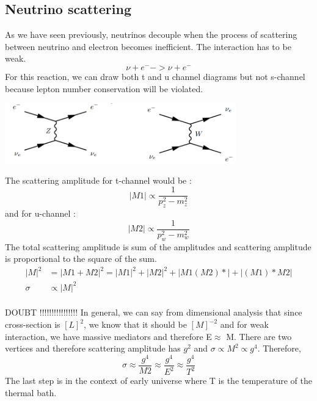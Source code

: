 \documentclass[12pt,a4paper,oneside]{book}
\begin{document}
\subsection{Neutrino scattering}
As we have seen previously, neutrinos decouple when the process of scattering between neutrino and electron becomes inefficient. The interaction has to be weak. 
\begin{equation*}
    \nu + e^{-} ->  \nu + e^{-}
\end{equation*}
For this reaction, we can draw both t and u channel diagrams but not s-channel because lepton number conservation will be violated.\par
\begin{minipage}{\linewidth}
    \centering
    \includegraphics[width = 10cm]{wz.png}
\end{minipage}
The scattering amplitude for t-channel would be :
\begin{equation}
    |M1| \propto \frac{1}{p_{z}^2-m_{z}^2}
\end{equation}
and for u-channel :
\begin{equation}
    |M2| \propto \frac{1}{p_{w}^2-m_{w}^2}
\end{equation}
The total scattering amplitude is sum of the amplitudes and scattering amplitude is proportional to the square of the sum.
\begin{align}
    |M|^2 &= |M1+M2|^2 = |M1|^2 + |M2|^2 + |M1(M2)*| + |(M1)*M2|\\
    \sigma & \propto |M|^2
\end{align}
\\ DOUBT !!!!!!!!!!!!!!!!
In general, we can say from dimensional analysis that since cross-section is $[L]^2$, we know that it should be $ [M]^{-2}$ and for weak interaction, we have massive mediators and therefore E$\approx$ M. There are two vertices and therefore scattering amplitude has $g^2$ and $\sigma \propto M^2 \propto g^4$. Therefore,
\begin{equation}
    \sigma \approx \frac{g^4}{M2} \approx \frac{g^4}{E^2} \approx \frac{g^4}{T^2}
\end{equation}
The last step is in the context of early universe where T is the temperature of the thermal bath.
\end{document}
